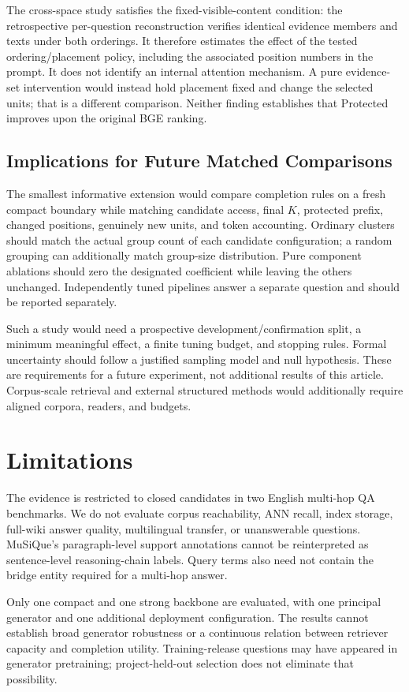 \documentclass[11pt,a4paper]{article}
\begin{document}
The cross-space study satisfies the fixed-visible-content condition:
the retrospective per-question reconstruction verifies identical evidence
members and texts under both orderings. It therefore estimates the effect of
the tested ordering/placement policy, including the associated position
numbers in the prompt. It does not identify an internal attention mechanism.
A pure evidence-set intervention would instead hold placement fixed and
change the selected units; that is a different comparison. Neither finding
establishes that Protected improves upon the original BGE ranking.

\subsection{Implications for Future Matched Comparisons}
The smallest informative extension would compare completion rules on a fresh
compact boundary while matching candidate access, final $K$, protected
prefix, changed positions, genuinely new units, and token accounting.
Ordinary clusters should match the actual group count of each candidate
configuration; a random grouping can additionally match group-size
distribution. Pure component ablations should zero the designated
coefficient while leaving the others unchanged. Independently tuned
pipelines answer a separate question and should be reported separately.

Such a study would need a prospective development/confirmation split, a
minimum meaningful effect, a finite tuning budget, and stopping rules.
Formal uncertainty should follow a justified sampling model and null
hypothesis. These are requirements for a future experiment, not additional
results of this article. Corpus-scale retrieval and external structured
methods would additionally require aligned corpora, readers, and budgets.

\section{Limitations}
The evidence is restricted to closed candidates in two English multi-hop QA
benchmarks. We do not evaluate corpus reachability, ANN recall, index
storage, full-wiki answer quality, multilingual transfer, or unanswerable
questions. MuSiQue's paragraph-level support annotations cannot be
reinterpreted as sentence-level reasoning-chain labels. Query terms also
need not contain the bridge entity required for a multi-hop answer.

Only one compact and one strong backbone are evaluated, with one principal
generator and one additional deployment configuration. The results cannot
establish broad generator robustness or a continuous relation between
retriever capacity and completion utility. Training-release questions may
have appeared in generator pretraining; project-held-out selection does not
eliminate that possibility.
\end{document}
